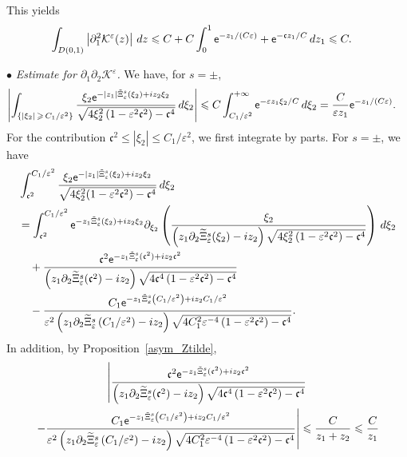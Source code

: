 \documentclass[AHL,Unicode,longabstracts,published]{cedram}
\newcommand*\p{\partial}
\newcommand*\BK{\mathcal{K}}
\newcommand*\ex{{\sf e}}
\newcommand*\cs{{\mathfrak c}}
\newcommand*\ii{\infty}
\newcommand*\gs{\geqslant }
\newcommand*\ls{\leqslant }
\newcommand*\e{\varepsilon}
\renewcommand*\t{\tilde}
\let\oldtilde\tilde
\renewcommand*{\tilde}[1]{\mathchoice{\widetilde{#1}}{\widetilde{#1}}{\oldtilde{#1}}{\oldtilde{#1}}}
\begin{document}
This yields
\begin{align*}
\int_{D(0,1)} \left\lvert \p_1^2 \BK^\e (z) \right\rvert \, dz & \ls C + C \int_0^1 \ex^{- z_1/(C \e) } + \ex^{ - \cs z_1/C } \, d z_1
\ls C.
\end{align*}


\noindent $ \bullet $ \emph{Estimate for $ \p_1 \p_2 \BK^\e $.} We have, for $ s = \pm $,
\begin{align*}
\left\lvert \int_{\left\{ |\xi_2 |\,\gs\,C_1 / \e^{2}\right\} } \frac{ \xi_2 \ex^{- |z_1| \t\Xi_\e^s (\xi_2) + i z_2 \xi_2} }{
\sqrt{ 4 \xi_2^2 \left(1 - \e^2 \cs^2\right) - \cs^4 } } \, d\xi_2 \right\rvert & \ls C \int_{C_1 / \e^{2}}^{+\ii } \ex^{- \e z_1 \xi_2 /C } \, d\xi_2 = \frac{C}{\e z_1} \ex^{ - z_1/(C \e) }.
\end{align*}
For the contribution $ \cs^2 \ls |\xi_2 | \ls C_1 / \e^{2} $, we first integrate by parts. For $ s= \pm $, we have
\begin{equation}\label{K12_zero_IPP}
\begin{split}
& \int_{ \cs^2 }^{ C_1 /\e^{2} } \frac{ \xi_2 \ex^{- |z_1| \t\Xi_\e^s (\xi_2) + i z_2 \xi_2} }{
\sqrt{ 4 \xi_2^2 (1 - \e^2 \cs^2) - \cs^4 } } \, d\xi_2
\\ & = \int_{ \cs^2 }^{ C_1 / \e^{2} } \ex^{- z_1 \t\Xi_\e^s (\xi_2) + i z_2 \xi_2}
\p_{\xi_2} \left(\frac{ \xi_2 }{\left(z_1 \p_2 \t\Xi_\e^s (\xi_2) - i z_2\right) \sqrt{ 4 \xi_2^2 \left(1 - \e^2 \cs^2\right) - \cs^4 } } \right) \, d\xi_2
\\& \quad + \frac{ \cs^2 \ex^{- z_1 \t\Xi_\e^s (\cs^2) + i z_2 \cs^2} }{\left(z_1 \p_2 \t\Xi_\e^s (\cs^2) - i z_2\right) \sqrt{ 4 \cs^4 \left(1 - \e^2 \cs^2\right) - \cs^4 } }
\\& \quad - \frac{ C_1 \ex^{- z_1 \t\Xi_\e^s \left(C_1 / \e^{2}\right) + i z_2 C_1 / \e^{2} } }{ \e^{2} \left(z_1 \p_2 \t\Xi_\e^s \left(C_1 / \e^{2}\right) - i z_2\right) \sqrt{ 4 C_1^2 \e^{-4} \left(1 - \e^2 \cs^2\right) - \cs^4 } }.
\end{split}
\end{equation}
In addition, by Proposition~\ref{asym_Ztilde},
\begin{multline*}
\left\lvert  \frac{ \cs^2 \ex^{- z_1 \t\Xi_\e^s (\cs^2) + i z_2 \cs^2} }{\left(z_1 \p_2 \t\Xi_\e^s (\cs^2) - i z_2\right) \sqrt{ 4 \cs^4 \left(1 - \e^2 \cs^2\right) - \cs^4 } }\right.
\\ \left. - \frac{ C_1 \ex^{- z_1 \t\Xi_\e^s \left(C_1 / \e^{2}\right) + i z_2 C_1 / \e^{2} } }{ \e^{2} \left(z_1 \p_2 \t\Xi_\e^s \left(C_1/ \e^{2}\right) - i z_2\right) \sqrt{ 4 C_1^2 \e^{-4} \left(1 - \e^2 \cs^2\right) - \cs^4 } }
\right\rvert
\ls \frac{C}{z_1+ z_2}
\ls \frac{C}{z_1}
\end{multline*}
\end{document}
